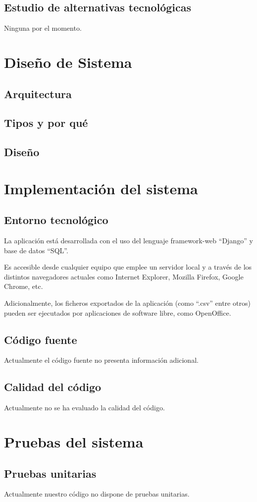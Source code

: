 \documentclass[12pt,letterpaper]{report}
\begin{document}
	\subsection{Estudio de alternativas tecnológicas}
		Ninguna por el momento.
\section{Diseño de Sistema}
	\subsection{Arquitectura}
	\subsection{Tipos y por qué}
	\subsection{Diseño}
\section{Implementación del sistema}
	\subsection{Entorno tecnológico}
	La aplicación está desarrollada con el uso del lenguaje framework-web “Django” y base de datos “SQL”.

Es accesible desde cualquier equipo que emplee un servidor local y a través de los distintos navegadores actuales como Internet Explorer, Mozilla Firefox, Google Chrome, etc.

Adicionalmente, los ficheros exportados de la aplicación (como “.csv” entre otros) pueden ser ejecutados por aplicaciones de software libre, como OpenOffice.
	\subsection{Código fuente}
	Actualmente el código fuente no presenta información adicional.
	\subsection{Calidad del código}
	Actualmente no se ha evaluado la calidad del código.
\section{Pruebas del sistema}
	\subsection{Pruebas unitarias}
	Actualmente nuestro código no dispone de pruebas unitarias.
\end{document}
